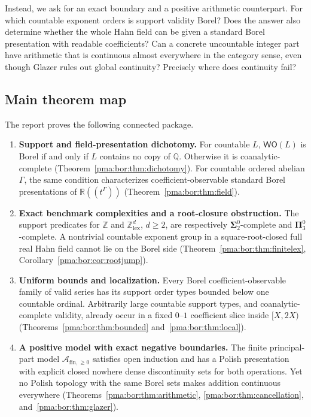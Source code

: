 \documentclass[11pt]{article}
\numberwithin{equation}{section}
\theoremstyle{definition}
\theoremstyle{remark}
\newcommand{\Z}{\mathbb Z}
\newcommand{\Q}{\mathbb Q}
\newcommand{\R}{\mathbb R}
\newcommand{\WO}{\mathsf{WO}}
\newcommand{\PP}{\mathcal A_{\mathrm{fin},\geq 0}}
\begin{document}
Instead, we ask for an exact boundary and a positive arithmetic counterpart.
For which countable exponent orders is support validity Borel? Does the answer
also determine whether the whole Hahn field can be given a standard Borel
presentation with readable coefficients? Can a concrete uncountable integer
part have arithmetic that is continuous almost everywhere in the category
sense, even though Glazer rules out global continuity? Precisely where does
continuity fail?

\subsection{Main theorem map}

The report proves the following connected package.
\begin{enumerate}[label=\textbf{\arabic*.}]
\item \textbf{Support and field-presentation dichotomy.}
For countable $L$, $\WO(L)$ is Borel if and only if $L$ contains no copy of
$\Q$. Otherwise it is coanalytic-complete
(Theorem~\ref{pma:bor:thm:dichotomy}). For countable ordered abelian $\Gamma$, the same
condition characterizes coefficient-observable standard Borel presentations
of $\R((t^\Gamma))$ (Theorem~\ref{pma:bor:thm:field}).
\item \textbf{Exact benchmark complexities and a root-closure obstruction.}
The support predicates for $\Z$ and $\Z^d_{\mathrm{lex}}$, $d\geq2$, are
respectively $\boldsymbol\Sigma^0_2$-complete and
$\boldsymbol\Pi^0_3$-complete. A nontrivial countable exponent group in a
square-root-closed full real Hahn field cannot lie on the Borel side
(Theorem~\ref{pma:bor:thm:finitelex}, Corollary~\ref{pma:bor:cor:rootjump}).
\item \textbf{Uniform bounds and localization.}
Every Borel coefficient-observable family of valid series has its support
order types bounded below one countable ordinal. Arbitrarily large countable
support types, and coanalytic-complete validity, already occur in a fixed
$0$--$1$ coefficient slice inside $[X,2X)$
(Theorems~\ref{pma:bor:thm:bounded} and~\ref{pma:bor:thm:local}).
\item \textbf{A positive model with exact negative boundaries.}
The finite principal-part model $\PP$ satisfies open induction and has a Polish
presentation with explicit closed nowhere dense discontinuity sets for both
operations. Yet no Polish topology with the same Borel sets makes addition
continuous everywhere (Theorems~\ref{pma:bor:thm:arithmetic},
\ref{pma:bor:thm:cancellation}, and~\ref{pma:bor:thm:glazer}).
\end{enumerate}
\end{document}
